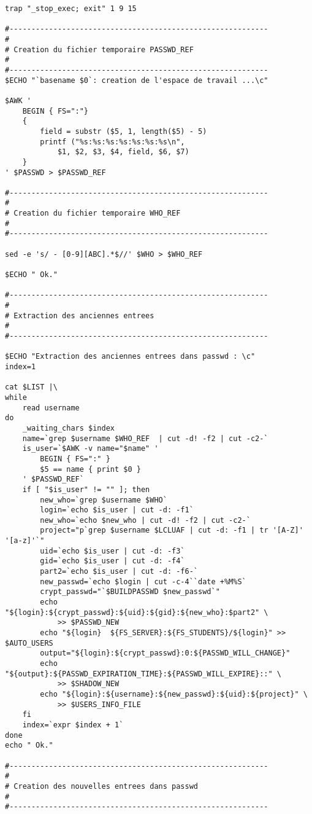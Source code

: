 \begin{verbatim}
trap "_stop_exec; exit" 1 9 15

#-----------------------------------------------------------
#
# Creation du fichier temporaire PASSWD_REF
#
#-----------------------------------------------------------
$ECHO "`basename $0`: creation de l'espace de travail ...\c"

$AWK '
    BEGIN { FS=":"}
    {
        field = substr ($5, 1, length($5) - 5)
        printf ("%s:%s:%s:%s:%s:%s:%s\n",
            $1, $2, $3, $4, field, $6, $7)
    }
' $PASSWD > $PASSWD_REF

#-----------------------------------------------------------
#
# Creation du fichier temporaire WHO_REF
#
#-----------------------------------------------------------

sed -e 's/ - [0-9][ABC].*$//' $WHO > $WHO_REF

$ECHO " Ok."

#-----------------------------------------------------------
#
# Extraction des anciennes entrees
#
#-----------------------------------------------------------

$ECHO "Extraction des anciennes entrees dans passwd : \c"
index=1

cat $LIST |\
while
    read username
do
    _waiting_chars $index
    name=`grep $username $WHO_REF  | cut -d! -f2 | cut -c2-`
    is_user=`$AWK -v name="$name" '
        BEGIN { FS=":" }
        $5 == name { print $0 }
    ' $PASSWD_REF`
    if [ "$is_user" != "" ]; then
        new_who=`grep $username $WHO`
        login=`echo $is_user | cut -d: -f1`
        new_who=`echo $new_who | cut -d! -f2 | cut -c2-`
        project="p`grep $username $LCLUAF | cut -d: -f1 | tr '[A-Z]' '[a-z]'`"
        uid=`echo $is_user | cut -d: -f3`
        gid=`echo $is_user | cut -d: -f4`
        part2=`echo $is_user | cut -d: -f6-`
        new_passwd=`echo $login | cut -c-4``date +%M%S`
        crypt_passwd="`$BUILDPASSWD $new_passwd`"
        echo "${login}:${crypt_passwd}:${uid}:${gid}:${new_who}:$part2" \
            >> $PASSWD_NEW
        echo "${login}  ${FS_SERVER}:${FS_STUDENTS}/${login}" >> $AUTO_USERS
        output="${login}:${crypt_passwd}:0:${PASSWD_WILL_CHANGE}"
        echo "${output}:${PASSWD_EXPIRATION_TIME}:${PASSWD_WILL_EXPIRE}::" \
            >> $SHADOW_NEW
        echo "${login}:${username}:${new_passwd}:${uid}:${project}" \
            >> $USERS_INFO_FILE
    fi
    index=`expr $index + 1`
done
echo " Ok."

#-----------------------------------------------------------
#
# Creation des nouvelles entrees dans passwd
#
#-----------------------------------------------------------


\end{verbatim}

